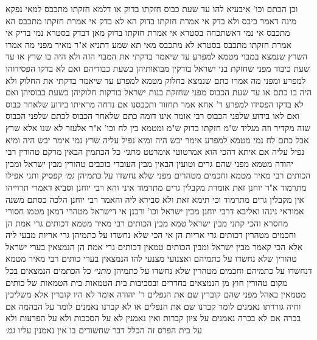 \documentclass[12pt, openany]{book}
\begin{document}
{וכן הכתם וכו' איבעיא להו  עד שעת כבוס חזקתו בדוק או דלמא חזקתו מתכבס 
למאי נפקא מינה דאמר כיבס ולא בדק  אי אמרת חזקתו בדוק הא לא בדק אי אמרת חזקתו מתכבס הא מתכבס 
אי נמי דאשתכחה בסטרא  אי אמרת חזקתו בדוק מאן דבדק בסטרא נמי בדיק  אי אמרת חזקתו מתכבס בסטרא לא מתכבס 
מאי  תא שמע דתניא א"ר מאיר  מפני מה אמרו השרץ שנמצא במבוי מטמא למפרע עד שיאמר בדקתי את המבוי הזה ולא היה בו שרץ או עד שעת כיבוד  מפני שחזקת בני ישראל בודקין מבואותיהן בשעת כבודיהם ואם לא בדקו הפסידוהו למפרע 
ומפני מה אמרו כתם שנמצא בחלוק מטמא למפרע עד שיאמר בדקתי את החלוק ולא היה בו כתם או עד שעת הכבוס  מפני שחזקת בנות ישראל בודקות חלוקיהן בשעת כבוסיהן ואם לא בדקו הפסידו למפרע 
ר' אחא אמר  תחזור ותכבסנו אם נדחה מראיתו בידוע שלאחר כבוס ואם לאו בידוע שלפני הכבוס 
רבי אומר  אינו דומה כתם שלאחר הכבוס לכתם שלפני הכבוס שזה מקדיר וזה מגליד  ש"מ  חזקתו בדוק ש"מ
ומטמא בין לח וכו' א"ר אלעזר  לא שנו אלא שרץ אבל כתם לח נמי מטמא למפרע אימר יבש היה ומיא נפיל עליה 
שרץ נמי אימר  יבש היה ומיא נפיל עליה  אם איתא דהכי הוא אמרטוטי אימרטט
{\large\emph{מתני׳}} כל הכתמין הבאין מרקם טהורין רבי יהודה מטמא מפני שהם גרים וטועין  הבאין מבין העובדי כוכבים טהורין  מבין ישראל ומבין הכותים רבי מאיר מטמא וחכמים מטהרים מפני שלא נחשדו על כתמיהן
{\large\emph{גמ׳}} קפסיק ותני אפילו מתרמוד א"ר יוחנן זאת אומרת  מקבלין גרים מתרמוד 
איני והא רבי יוחנן וסביא דאמרי תרוייהו  אין מקבלין גרים מתרמוד 
וכי תימא  זאת ולא סבירא ליה והאמר רבי יוחנן  הלכה כסתם משנה 
אמוראי נינהו ואליבא דרבי יוחנן
מבין ישראל וכו' ורבנן אי דישראל מטהרי דמאן מטמו 
חסורי מחסרא והכי קתני  מבין ישראל טמא  מבין הכותים רבי מאיר מטמא דכותים גרי אמת הן  וחכמים מטהרין דכותים גרי אריות הן 
אי הכי שלא נחשדו על כתמיהן גרי אריות מבעי ליה 
אלא הכי קאמר  מבין ישראל ומבין הכותים טמאין דכותים גרי אמת הן  הנמצאין בערי ישראל טהורין שלא נחשדו על כתמיהם ואצנועי מצנעי להו 
הנמצאין בערי כותים רבי מאיר מטמא דנחשדו על כתמיהם  וחכמים מטהרין שלא נחשדו על כתמיהן 
{\large\emph{מתני׳}} כל הכתמים הנמצאים בכל מקום טהורין חוץ מן הנמצאים בחדרים ובסביבות בית הטמאות
בית הטמאות של כותים מטמאין באהל מפני שהם קוברין שם את הנפלים  ר' יהודה אומר  לא היו קוברין אלא משליכין וחיה גוררתו 
נאמנים לומר קברנו שם את הנפלים או לא קברנו  נאמנים לומר על הבהמה אם בכרה אם לא בכרה  נאמנים על ציון קברות
ואין נאמנין לא על הסככות ולא על הפרעות ולא על בית הפרס 
זה הכלל  דבר שחשודים בו אין נאמנין עליו {\large\emph{גמ׳}} }
\end{document}
